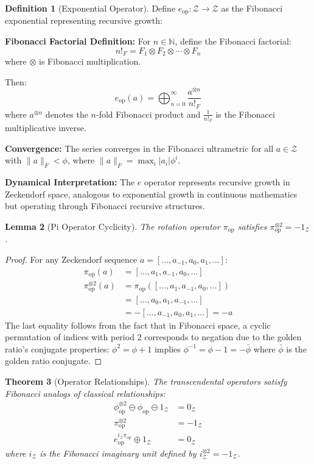 \documentclass[12pt]{article}
\theoremstyle{plain}
\newtheorem{theorem}{Theorem}[section]
\newtheorem{lemma}[theorem]{Lemma}
\theoremstyle{definition}
\newtheorem{definition}[theorem]{Definition}
\begin{document}
\begin{definition}[Exponential Operator]
Define $e_{\text{op}}: \mathcal{Z} \to \mathcal{Z}$ as the Fibonacci exponential representing recursive growth:

\textbf{Fibonacci Factorial Definition:} For $n \in \mathbb{N}$, define the Fibonacci factorial:
$$n!_F = F_1 \otimes F_2 \otimes \cdots \otimes F_n$$
where $\otimes$ is Fibonacci multiplication.

Then:
$$e_{\text{op}}(a) = \bigoplus_{n=0}^{\infty} \frac{a^{\otimes n}}{n!_F}$$
where $a^{\otimes n}$ denotes the $n$-fold Fibonacci product and $\frac{1}{n!_F}$ is the Fibonacci multiplicative inverse.

\textbf{Convergence:} The series converges in the Fibonacci ultrametric for all $a \in \mathcal{Z}$ with $\|a\|_F < \phi$, where $\|a\|_F = \max_i |a_i| \phi^i$.

\textbf{Dynamical Interpretation:} The $e$ operator represents recursive growth in Zeckendorf space, analogous to exponential growth in continuous mathematics but operating through Fibonacci recursive structures.
\end{definition}

\begin{lemma}[Pi Operator Cyclicity]
The rotation operator $\pi_{\text{op}}$ satisfies $\pi_{\text{op}}^{\otimes 2} = -1_{\mathcal{Z}}$.
\end{lemma}

\begin{proof}
For any Zeckendorf sequence $a = [\ldots, a_{-1}, a_0, a_1, \ldots]$:
\begin{align}
\pi_{\text{op}}(a) &= [\ldots, a_1, a_{-1}, a_0, \ldots]\\
\pi_{\text{op}}^{\otimes 2}(a) &= \pi_{\text{op}}([\ldots, a_1, a_{-1}, a_0, \ldots])\\
&= [\ldots, a_0, a_1, a_{-1}, \ldots]\\
&= -[\ldots, a_{-1}, a_0, a_1, \ldots] = -a
\end{align}
The last equality follows from the fact that in Fibonacci space, a cyclic permutation of indices with period 2 corresponds to negation due to the golden ratio's conjugate properties: $\phi^2 = \phi + 1$ implies $\phi^{-1} = \phi - 1 = -\bar{\phi}$ where $\bar{\phi}$ is the golden ratio conjugate.
\end{proof}

\begin{theorem}[Operator Relationships]
The transcendental operators satisfy Fibonacci analogs of classical relationships:
\begin{align}
\phi_{\text{op}}^{\otimes 2} \ominus \phi_{\text{op}} \ominus 1_{\mathcal{Z}} &= 0_{\mathcal{Z}} \label{eq:phi-relation}\\
\pi_{\text{op}}^{\otimes 2} &= -1_{\mathcal{Z}} \label{eq:pi-cycle}\\
e_{\text{op}}^{i_{\mathcal{Z}}\pi_{\text{op}}} \oplus 1_{\mathcal{Z}} &= 0_{\mathcal{Z}} \label{eq:euler-fibonacci}
\end{align}
where $i_{\mathcal{Z}}$ is the Fibonacci imaginary unit defined by $i_{\mathcal{Z}}^{\otimes 2} = -1_{\mathcal{Z}}$.
\end{theorem}
\end{document}
